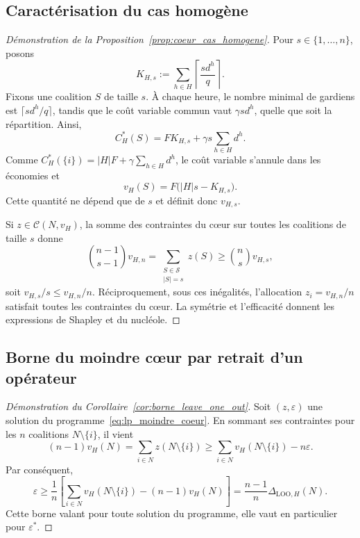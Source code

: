 \subsection{Caractérisation du cas homogène}
\label{app:preuve_cas_homogene}

\begin{proof}[Démonstration de la Proposition~\ref{prop:coeur_cas_homogene}]
Pour \(s\in\{1,\ldots,n\}\), posons
\[
K_{H,s}:=\sum_{h\in H}\left\lceil\frac{sd^h}{q}\right\rceil.
\]
Fixons une coalition \(S\) de taille \(s\). À chaque heure, le nombre minimal
de gardiens est \(\lceil sd^h/q\rceil\), tandis que le coût variable commun
vaut \(\gamma sd^h\), quelle que soit la répartition. Ainsi,
\[
C_H^*(S)=FK_{H,s}+\gamma s\sum_{h\in H}d^h.
\]
Comme
\(C_H^*(\{i\})=|H|F+\gamma\sum_{h\in H}d^h\), le coût variable s'annule
dans les économies et
\[
v_H(S)=F\bigl(|H|s-K_{H,s}\bigr).
\]
Cette quantité ne dépend que de \(s\) et définit donc \(v_{H,s}\).

Si \(z\in\mathcal C(N,v_H)\), la somme des contraintes du cœur sur toutes les
coalitions de taille \(s\) donne
\[
\binom{n-1}{s-1}v_{H,n}
=
\sum_{\substack{S\in\mathcal S\\|S|=s}}z(S)
\geqslant
\binom{n}{s}v_{H,s},
\]
soit \(v_{H,s}/s\leqslant v_{H,n}/n\). Réciproquement, sous ces inégalités,
l'allocation \(z_i=v_{H,n}/n\) satisfait toutes les contraintes du cœur.
La symétrie et l'efficacité donnent les expressions de Shapley et du
nucléole.
\end{proof}

\subsection{Borne du moindre cœur par retrait d'un opérateur}
\label{app:preuve_borne_leave_one_out}

\begin{proof}[Démonstration du Corollaire~\ref{cor:borne_leave_one_out}]
Soit \((z,\varepsilon)\) une solution du
programme~\eqref{eq:lp_moindre_coeur}. En sommant ses contraintes pour les \(n\)
coalitions \(N\setminus\{i\}\), il vient
\[
    (n-1)v_H(N)
    =
    \sum_{i\in N}z(N\setminus\{i\})
    \geqslant
    \sum_{i\in N}v_H(N\setminus\{i\})-n\varepsilon.
\]
Par conséquent,
\[
    \varepsilon
    \geqslant
    \frac{1}{n}
    \left[
        \sum_{i\in N}v_H(N\setminus\{i\})-(n-1)v_H(N)
    \right]
    =
    \frac{n-1}{n}\Delta_{\mathrm{LOO},H}(N).
\]
Cette borne valant pour toute solution du programme, elle vaut en particulier
pour \(\varepsilon^*\).
\end{proof}

